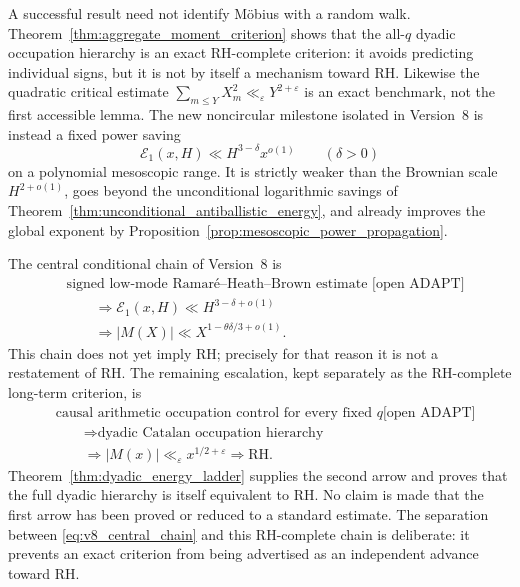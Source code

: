 \documentclass[11pt]{amsart}
\numberwithin{equation}{section}
\theoremstyle{plain}
\theoremstyle{definition}
\theoremstyle{remark}
\newcommand{\Mert}{M}
\newcommand{\eps}{\varepsilon}
\begin{document}
A successful result need not identify M\"obius with a random walk.  Theorem~\ref{thm:aggregate_moment_criterion}
shows that the all-$q$ dyadic occupation hierarchy is an exact RH-complete
criterion: it avoids predicting individual signs, but it is not by itself a
mechanism toward RH.  Likewise the quadratic critical estimate
$\sum_{m\le Y}X_m^2\ll_\varepsilon Y^{2+\varepsilon}$ is an exact benchmark,
not the first accessible lemma.  The new noncircular milestone isolated in
Version~8 is instead a fixed power saving
\begin{equation}
 \mathcal E_1(x,H)\ll H^{3-\delta}x^{o(1)}
 \qquad(\delta>0)
\label{eq:v8_first_milestone}
\end{equation}
on a polynomial mesoscopic range.  It is strictly weaker than the Brownian
scale $H^{2+o(1)}$, goes beyond the unconditional logarithmic savings of
Theorem~\ref{thm:unconditional_antiballistic_energy}, and already improves the
global exponent by Proposition~\ref{prop:mesoscopic_power_propagation}.

The central conditional chain of Version~8 is
\begin{equation}
\begin{aligned}
&\text{signed low-mode Ramar\'e--Heath--Brown estimate [open ADAPT]}\\
&\qquad\Longrightarrow \mathcal E_1(x,H)\ll H^{3-\delta+o(1)}\\
&\qquad\Longrightarrow
 |\Mert(X)|\ll X^{1-\theta\delta/3+o(1)}.
\end{aligned}
\label{eq:v8_central_chain}
\end{equation}
This chain does not yet imply RH; precisely for that reason it is not a
restatement of RH.  The remaining escalation, kept separately as the
RH-complete long-term criterion, is
\begin{equation}
\begin{aligned}
&\text{causal arithmetic occupation control for every fixed $q$
       [open ADAPT]}\\
&\qquad\Longrightarrow \text{dyadic Catalan occupation hierarchy}\\
&\qquad\Longrightarrow
|\Mert(x)|\ll_\eps x^{1/2+\eps}
\Longrightarrow \mathrm{RH}.
\end{aligned}
\end{equation}
Theorem~\ref{thm:dyadic_energy_ladder} supplies the second arrow and proves
that the full dyadic hierarchy is itself equivalent to RH.  No claim is made
that the first arrow has been proved or reduced to a standard estimate.  The
separation between \eqref{eq:v8_central_chain} and this RH-complete chain is
deliberate: it prevents an exact criterion from being advertised as an
independent advance toward RH.
\end{document}
